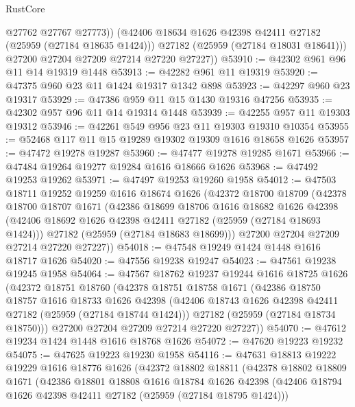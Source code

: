 \begin{lexlean}{RustCore}
\begin{coremodule}
              @27762
              @27767
              @27773))
          (@42406 @18634 @1626 @42398 @42411 @27182 (@25959 (@27184 @18635 @1424)))
          @27182
          (@25959 (@27184 @18031 @18641)))
        @27200
        @27204
        @27209
        @27214
        @27220
        @27227))
@53910 := @42302 @961 @96 @11 @14 @19319 @1448
@53913 := @42282 @961 @11 @19319
@53920 := @47375 @960 @23 @11 @1424 @19317 @1342 @898
@53923 := @42297 @960 @23 @19317
@53929 := @47386 @959 @11 @15 @1430 @19316 @47256
@53935 := @42302 @957 @96 @11 @14 @19314 @1448
@53939 := @42255 @957 @11 @19303 @19312
@53946 := @42261 @549 @956 @23 @11 @19303 @19310 @10354
@53955 := @52468 @117 @11 @15 @19289 @19302 @19309 @1616 @18658 @1626
@53957 := @47472 @19278 @19287
@53960 := @47477 @19278 @19285 @1671
@53966 := @47484 @19264 @19277 @19284 @1616 @18666 @1626
@53968 := @47492 @19253 @19262
@53971 := @47497 @19253 @19260 @1958
@54012 := @47503
    @18711
    @19252
    @19259
    @1616
    @18674
    @1626
    (@42372
      @18700
      @18709
      (@42378
        @18700
        @18707
        @1671
        (@42386
          @18699
          @18706
          @1616
          @18682
          @1626
          @42398
          (@42406 @18692 @1626 @42398 @42411 @27182 (@25959 (@27184 @18693 @1424)))
          @27182
          (@25959 (@27184 @18683 @18699)))
        @27200
        @27204
        @27209
        @27214
        @27220
        @27227))
@54018 := @47548 @19249 @1424 @1448 @1616 @18717 @1626
@54020 := @47556 @19238 @19247
@54023 := @47561 @19238 @19245 @1958
@54064 := @47567
    @18762
    @19237
    @19244
    @1616
    @18725
    @1626
    (@42372
      @18751
      @18760
      (@42378
        @18751
        @18758
        @1671
        (@42386
          @18750
          @18757
          @1616
          @18733
          @1626
          @42398
          (@42406 @18743 @1626 @42398 @42411 @27182 (@25959 (@27184 @18744 @1424)))
          @27182
          (@25959 (@27184 @18734 @18750)))
        @27200
        @27204
        @27209
        @27214
        @27220
        @27227))
@54070 := @47612 @19234 @1424 @1448 @1616 @18768 @1626
@54072 := @47620 @19223 @19232
@54075 := @47625 @19223 @19230 @1958
@54116 := @47631
    @18813
    @19222
    @19229
    @1616
    @18776
    @1626
    (@42372
      @18802
      @18811
      (@42378
        @18802
        @18809
        @1671
        (@42386
          @18801
          @18808
          @1616
          @18784
          @1626
          @42398
          (@42406 @18794 @1626 @42398 @42411 @27182 (@25959 (@27184 @18795 @1424)))

\end{coremodule}
\end{lexlean}
